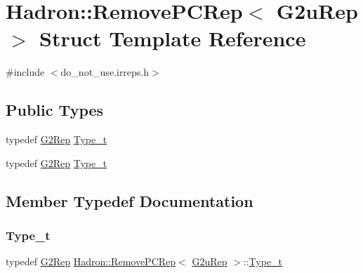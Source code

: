 \hypertarget{structHadron_1_1RemovePCRep_3_01G2uRep_01_4}{}\section{Hadron\+:\+:Remove\+P\+C\+Rep$<$ G2u\+Rep $>$ Struct Template Reference}
\label{structHadron_1_1RemovePCRep_3_01G2uRep_01_4}


{\ttfamily \#include $<$do\+\_\+not\+\_\+use.\+irreps.\+h$>$}

\subsection*{Public Types}
\begin{DoxyCompactItemize}
\item 
typedef \mbox{\hyperlink{structHadron_1_1G2Rep}{G2\+Rep}} \mbox{\hyperlink{structHadron_1_1RemovePCRep_3_01G2uRep_01_4_a3f2f1b8d829dddece230705318521005}{Type\+\_\+t}}
\item 
typedef \mbox{\hyperlink{structHadron_1_1G2Rep}{G2\+Rep}} \mbox{\hyperlink{structHadron_1_1RemovePCRep_3_01G2uRep_01_4_a3f2f1b8d829dddece230705318521005}{Type\+\_\+t}}
\end{DoxyCompactItemize}


\subsection{Member Typedef Documentation}
\mbox{\label{structHadron_1_1RemovePCRep_3_01G2uRep_01_4_a3f2f1b8d829dddece230705318521005}} 
\subsubsection{\texorpdfstring{Type\_t}{Type\_t}\hspace{0.1cm}{\footnotesize\ttfamily [1/2]}}
{\footnotesize\ttfamily typedef \mbox{\hyperlink{structHadron_1_1G2Rep}{G2\+Rep}} \mbox{\hyperlink{structHadron_1_1RemovePCRep}{Hadron\+::\+Remove\+P\+C\+Rep}}$<$ \mbox{\hyperlink{structHadron_1_1G2uRep}{G2u\+Rep}} $>$\+::\mbox{\hyperlink{structHadron_1_1RemovePCRep_3_01G2uRep_01_4_a3f2f1b8d829dddece230705318521005}{Type\+\_\+t}}}


